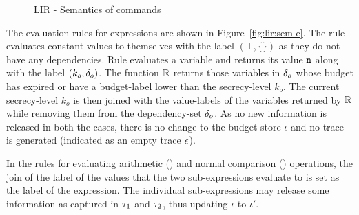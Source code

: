 \begin{figure}[!htbp]
\begin{framed}
\end{framed}
\caption{LIR - Semantics of commands}
\label{fig:lir:sem-c}
\end{figure}

The evaluation rules for expressions are shown in Figure~\ref{fig:lir:sem-e}.
The rule  evaluates constant values to themselves with
  the label $(\bot, \{\})$ as they do not have any dependencies.  
Rule  evaluates a variable and returns its value $\texttt{n}$ along
  with the label $(k_o, \delta_o)$. The function $\mathbb{R}$ returns those
  variables in $\delta_o$ whose budget has expired or have a
  budget-label lower than the secrecy-level $k_o$. The current
  secrecy-level $k_o$ is then joined with the value-labels of the
  variables returned by $\mathbb{R}$ while removing them from the
  dependency-set $\delta_o$.  As no new information is released in both
  the cases, there is no change to the budget store $\iota$ and no
  trace is generated (indicated as an empty trace $\epsilon$).  
  
In the rules for evaluating arithmetic ()
and normal comparison () operations, 
the join of the label of the values that the two sub-expressions 
evaluate to is set as the label of the expression. The individual 
sub-expressions may release some information as captured in 
$\tau_1$ and $\tau_2$, thus updating $\iota$ to $\iota'$.

